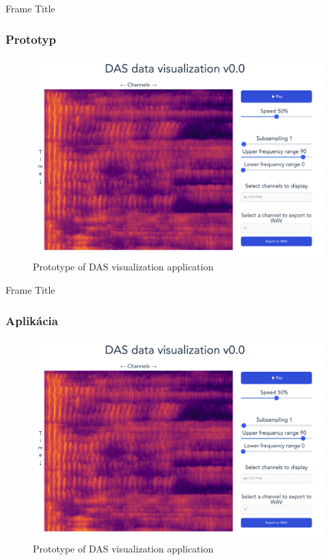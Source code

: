 \documentclass[%
  12pt,       				%
	t,                  %
	aspectratio=1610,   %
	unicode,						%
]{beamer}				    	%
\begin{document}
\begin{frame}{Frame Title}
    \frametitle{Prototyp}
    \begin{figure}
        \centering
        \includegraphics[width=0.8\linewidth]{obrazky/svelte_prototype.png}
        \caption{Prototype of DAS visualization application}
        \label{fig:prototypesvelte}
    \end{figure}
\end{frame}


\begin{frame}{Frame Title}
    \frametitle{Aplikácia }
    \begin{figure}
        \centering
        \includegraphics[width=0.8\linewidth]{obrazky/svelte_prototype.png}
        \caption{Prototype of DAS visualization application}
        \label{fig:prototypesvelte}
    \end{figure}
\end{frame}



	
\end{document}
